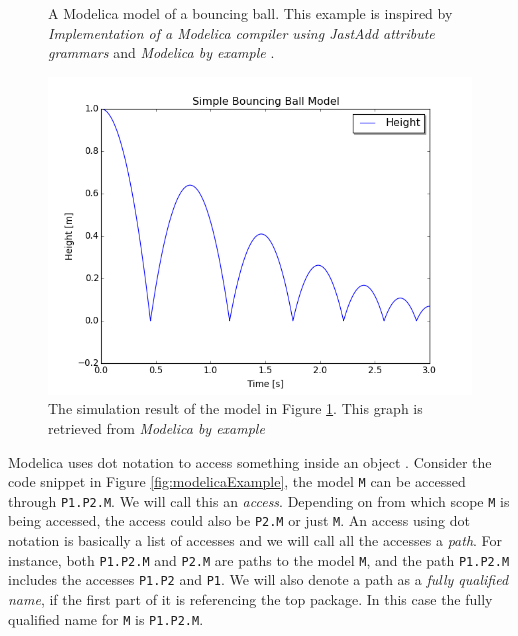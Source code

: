 \documentclass{cslthse-msc}
\begin{document}
\begin{figure}[!htbp]
    \centering
    
    \caption{A Modelica model of a bouncing ball. This example is inspired by \textit{Implementation of a Modelica compiler using JastAdd attribute grammars} \cite{aakesson2010implementation} and \textit{Modelica by example} \cite{tillermodelica}.}
    \label{fig:bouncingBallCode}
\end{figure}

\begin{figure}[!htbp]
    \centering
    \includegraphics[width=1.0\textwidth]{Pictures/BB1.png}
    \caption{The simulation result of the model in Figure \ref{fig:bouncingBallCode}. This graph is retrieved from \textit{Modelica by example} \cite{tillermodelica}}
    \label{fig:bouncingBallSimulation}
\end{figure}

Modelica uses dot notation to access something inside an object \cite{modelicamodelica}. Consider the code snippet in Figure \ref{fig:modelicaExample}, the model \texttt{M} can be accessed through \texttt{P1.P2.M}. We will call this an \emph{access}. Depending on from which scope \texttt{M} is being accessed, the access could also be \texttt{P2.M} or just \texttt{M}. An access using dot notation is basically a list of accesses and we will call all the accesses a \emph{path}. For instance, both \texttt{P1.P2.M} and \texttt{P2.M} are paths to the model \texttt{M}, and the path \texttt{P1.P2.M} includes the accesses \texttt{P1.P2} and \texttt{P1}. We will also denote a path as a \emph{fully qualified name}, if the first part of it is referencing the top package. In this case the fully qualified name for \texttt{M} is \texttt{P1.P2.M}.
\end{document}

